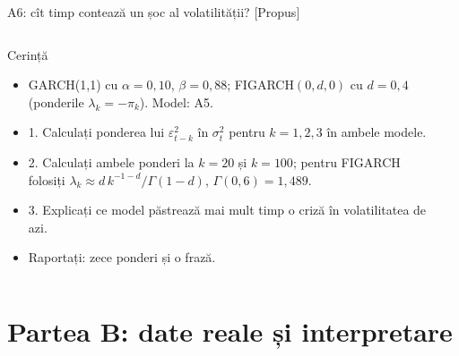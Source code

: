 \begin{frame}{A6: cît timp contează un șoc al volatilității? [Propus]}
\propsub
\itemsize{\scriptsize}
\begin{columns}[T]
\begin{column}{\taskw}
\begin{block}{Cerință}
\begin{itemize}
    \item GARCH(1,1) cu $\alpha = 0{,}10$, $\beta = 0{,}88$; FIGARCH$(0, d, 0)$ cu $d = 0{,}4$ (ponderile $\lambda_k = -\pi_k$). Model: A5.
    \item 1. Calculați ponderea lui $\varepsilon_{t-k}^2$ în $\sigma_t^2$ pentru $k = 1, 2, 3$ în ambele modele.
    \item 2. Calculați ambele ponderi la $k = 20$ și $k = 100$; pentru FIGARCH folosiți $\lambda_k \approx d\,k^{-1-d}/\Gamma(1-d)$, $\Gamma(0{,}6) = 1{,}489$.
    \item 3. Explicați ce model păstrează mai mult timp o criză în volatilitatea de azi.
    \item Raportați: zece ponderi și o frază.
\end{itemize}
\end{block}
\end{column}
\begin{column}{\solw}
\end{column}
\end{columns}
\end{frame}


\section{Partea B: date reale și interpretare}

